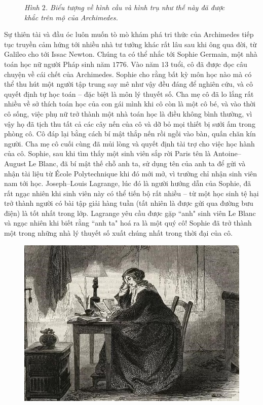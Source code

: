 \begin{multicols}{2}
\begin{figure}[H]
		\caption{\small\textit{\color{quantoan}Hình $2$. Biểu tượng về hình cầu và hình trụ như thế này đã được khắc trên mộ của Archimedes.}}
		\vspace*{-10pt}
	\end{figure}
	Sự thiên tài và đầu óc luôn muốn tò mò khám phá tri thức của Archimedes tiếp tục truyền cảm hứng tới nhiều nhà tư tưởng khác rất lâu sau khi ông qua đời, từ Galileo cho tới Issac Newton. Chúng ta có thể nhắc tới Sophie Germain, một nhà toán học nữ người Pháp sinh năm $1776$. Vào năm $13$ tuổi, cô đã được đọc câu chuyện về cái chết của Archimedes. Sophie cho rằng bất kỳ môn học nào mà có thể thu hút một người tập trung say mê như vậy đều đáng để nghiên cứu, và cô quyết định tự học toán -- đặc biệt là môn lý thuyết số. Cha mẹ cô đã lo lắng rất nhiều về sở thích toán học của con gái mình khi cô còn là một cô bé, và vào thời cô sống, việc phụ nữ trở thành một nhà toán học là điều không bình thường, vì vậy họ đã tịch thu tất cả các cây nến của cô và dỡ bỏ mọi thiết bị sưởi ấm trong phòng cô. Cô đáp lại bằng cách bí mật thắp nến rồi ngồi vào bàn, quấn chăn kín người. Cha mẹ cô cuối cùng đã mủi lòng và quyết định tài trợ cho việc học hành của cô. Sophie, sau khi tìm thấy một sinh viên sắp rời Paris tên là Antoine--August Le Blanc, đã bí mật thế chỗ anh ta, sử dụng tên của anh ta để gửi và nhận tài liệu từ École Polytechnique khi đó mới mở,  vì trường chỉ nhận sinh viên nam tới học. Joseph--Louis Lagrange, lúc đó là người hướng dẫn của Sophie, đã rất ngạc nhiên khi  sinh viên này có thể tiến bộ rất nhiều -- từ một học sinh tệ hại trở thành người có bài tập giải hàng tuần (tất nhiên là được gửi qua đường bưu điện) là tốt nhất trong lớp. Lagrange yêu cầu được gặp ``anh" sinh viên Le Blanc và ngạc nhiên khi biết rằng ``anh ta" hoá ra là một quý cô! Sophie đã trở thành một trong những nhà lý thuyết số xuất chúng nhất trong thời đại của cô.
	\begin{figure}[H]
		\vspace*{5pt}
		\centering
		\captionsetup{labelformat= empty, justification=centering}
		\includegraphics[width= 1\linewidth]{4}

\end{figure}
\end{multicols}
